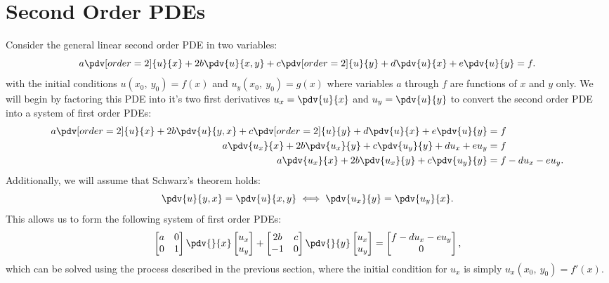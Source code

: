 \documentclass{article}
\theoremstyle{definition}
\begin{document}
\section{Second Order PDEs}
Consider the general linear second order PDE in two variables:
\begin{equation*}
    a \pdv[order=2]{u}{x} + 2b \pdv{u}{x,y} + c \pdv[order=2]{u}{y} + d \pdv{u}{x} + e \pdv{u}{y} = f.
\end{equation*}
with the initial conditions \(u\left( x_0,\: y_0 \right) = f\left( x \right)\)
and \(u_y\left( x_0,\: y_0 \right) = g\left( x \right)\) where variables
\(a\) through \(f\) are functions of \(x\) and \(y\) only. We will begin
by factoring this PDE into it's two first derivatives
\(u_x = \pdv{u}{x}\) and \(u_y = \pdv{u}{y}\) to convert the second
order PDE into a system of first order PDEs:
\begin{align*}
    a \pdv[order=2]{u}{x} + 2b \pdv{u}{y,x} + c \pdv[order=2]{u}{y} + d \pdv{u}{x} + e \pdv{u}{y} & = f                  \\
    a \pdv{u_x}{x} + 2b \pdv{u_x}{y} + c \pdv{u_y}{y} + d u_x + e u_y                             & = f                  \\
    a \pdv{u_x}{x} + 2b \pdv{u_x}{y} + c \pdv{u_y}{y}                                             & = f - d u_x - e u_y.
\end{align*}
Additionally, we will assume that Schwarz's theorem holds:
\begin{equation*}
    \pdv{u}{y,x} = \pdv{u}{x,y} \iff \pdv{u_x}{y} = \pdv{u_y}{x}.
\end{equation*}
This allows us to form the following system of first order PDEs:
\begin{equation*}
    \begin{bmatrix}
        a & 0 \\
        0 & 1
    \end{bmatrix}
    \pdv{}{x}
    \begin{bmatrix}
        u_x \\
        u_y
    \end{bmatrix}
    +
    \begin{bmatrix}
        2b & c \\
        -1 & 0
    \end{bmatrix}
    \pdv{}{y}
    \begin{bmatrix}
        u_x \\
        u_y
    \end{bmatrix}
    =
    \begin{bmatrix}
        f - d u_x - e u_y \\
        0
    \end{bmatrix}
    ,
\end{equation*}
which can be solved using the process described in the previous section,
where the initial condition for \(u_x\) is simply
\(u_x\left( x_0,\: y_0 \right) = f'\left( x \right)\).
\end{document}

